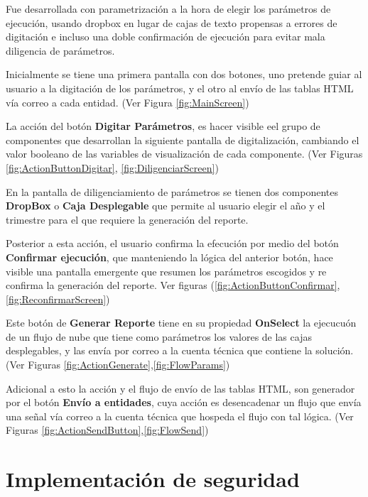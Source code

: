 \documentclass[letter,oneside,12pt,spanish]{report}
\begin{document}
\noindent Fue desarrollada con parametrización a la hora de elegir los parámetros de ejecución, usando dropbox en lugar de cajas de texto propensas a errores de digitación e incluso una doble confirmación de ejecución para evitar mala diligencia de parámetros.


\noindent Inicialmente se tiene una primera pantalla con dos botones, uno pretende guiar al usuario a la digitación de los parámetros, y el otro al envío de las tablas HTML vía correo a cada entidad. (Ver Figura \ref{fig:MainScreen})


\noindent La acción del botón \textbf{Digitar Parámetros}, es hacer visible eel grupo de componentes que desarrollan la siguiente pantalla de digitalización, cambiando el valor booleano de las variables de visualización de cada componente. (Ver Figuras \ref{fig:ActionButtonDigitar}, \ref{fig:DiligenciarScreen})

\noindent En la pantalla de diligenciamiento de parámetros se tienen dos componentes \textbf{DropBox} o \textbf{Caja Desplegable} que permite al usuario elegir el año y el trimestre para el que requiere la generación del reporte. 

\noindent Posterior a esta acción, el usuario confirma la efecución por medio del botón \textbf{Confirmar ejecución}, que manteniendo la lógica del anterior botón, hace visible una pantalla emergente que resumen los parámetros escogidos y re confirma la generación del reporte. Ver figuras (\ref{fig:ActionButtonConfirmar}, \ref{fig:ReconfirmarScreen})

\noindent Este botón de \textbf{Generar Reporte} tiene en su propiedad \textbf{OnSelect} la ejecucuón de un flujo de nube que tiene como parámetros los valores de las cajas desplegables, y las envía por correo a la cuenta técnica que contiene la solución. (Ver Figuras \ref{fig:ActionGenerate},\ref{fig:FlowParams})

\noindent Adicional a esto la acción y el flujo de envío de las tablas HTML, son generador por el botón \textbf{Envío a entidades}, cuya acción es desencadenar un flujo que envía una señal vía correo a la cuenta técnica que hospeda el flujo con tal lógica. (Ver Figuras \ref{fig:ActionSendButton},\ref{fig:FlowSend})


\newpage

\section{Implementación de seguridad}
\end{document}
